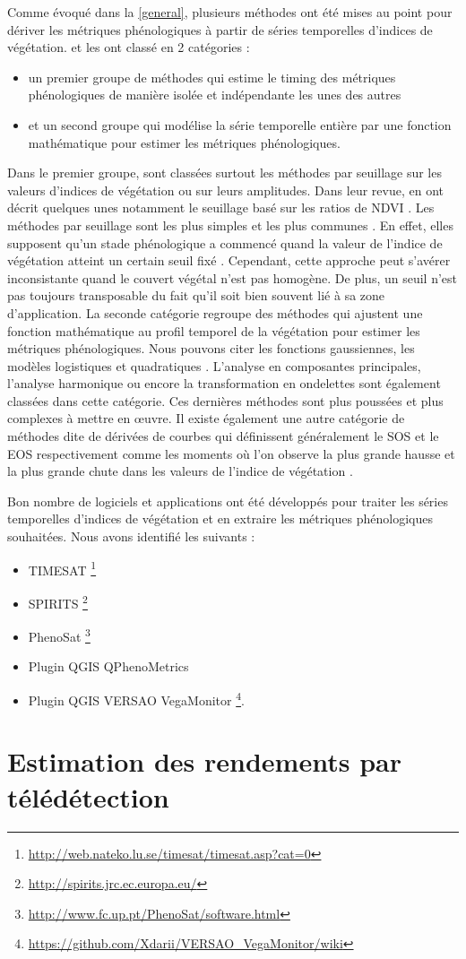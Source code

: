 Comme évoqué dans la \cref{general}, plusieurs méthodes ont été mises au point pour dériver les métriques phénologiques à partir de séries temporelles d'indices de végétation.
\citet{Beck2006} et \citet{Atzberger2013} les ont classé en 2 catégories : 
\begin{itemize}
 \item un premier groupe de méthodes qui estime le timing des métriques phénologiques de manière isolée et indépendante les unes des autres
 \item et un second groupe qui modélise la série temporelle entière par une fonction mathématique pour estimer les métriques phénologiques.
\end{itemize}
Dans le premier groupe, sont classées surtout les méthodes par seuillage sur les valeurs d'indices de végétation ou sur leurs amplitudes. Dans leur revue, \citet{deBeurs2010} en ont décrit quelques unes notamment le seuillage basé sur les ratios de NDVI \citep{White1997}. Les méthodes par seuillage sont les plus simples et les plus communes \citep{Pan2015}. En effet, elles supposent qu’un stade phénologique a commencé quand 
la valeur de l'indice de végétation atteint un certain seuil fixé \citep{Jonsson2002}. Cependant, cette approche peut s'avérer inconsistante quand le couvert végétal n'est 
pas homogène. De plus, un seuil n'est pas toujours transposable du fait qu'il soit bien souvent lié à sa zone d'application. La seconde catégorie regroupe des méthodes qui ajustent une fonction mathématique au profil temporel de la végétation pour estimer les métriques phénologiques. Nous pouvons citer les fonctions gaussiennes, les modèles logistiques et quadratiques \citep{Zhang2003,Jonsson2004}. L'analyse en composantes principales, l'analyse harmonique ou encore la transformation en ondelettes sont également classées dans cette catégorie. Ces dernières méthodes sont plus poussées et plus complexes à mettre en \oe uvre. Il existe également une autre catégorie de méthodes dite de dérivées de courbes qui définissent généralement le SOS et le EOS respectivement comme les moments où l'on observe la plus grande hausse et la plus grande chute dans les valeurs de l'indice de végétation \citep{Moulin1997,tateishi2004}.

\vspace{5mm}

Bon nombre de logiciels et applications ont été développés pour traiter les séries temporelles d'indices de végétation et en extraire les métriques phénologiques souhaitées. 
Nous avons identifié les suivants :
\begin{itemize}
 \item TIMESAT \footnote{\url{http://web.nateko.lu.se/timesat/timesat.asp?cat=0}} \citep{Eklundh2017} 
 \item SPIRITS \footnote{\url{http://spirits.jrc.ec.europa.eu/}}
 \item PhenoSat \footnote{\url{http://www.fc.up.pt/PhenoSat/software.html}} \citep{Rodrigues2013}
 \item Plugin QGIS QPhenoMetrics \citep{Duarte2018}
 \item Plugin QGIS VERSAO VegaMonitor \footnote{\url{https://github.com/Xdarii/VERSAO_VegaMonitor/wiki}}.
\end{itemize}

\section{Estimation des rendements par télédétection}
